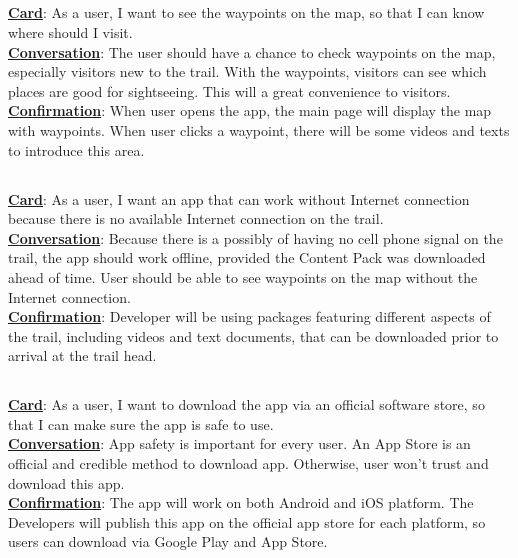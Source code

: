 \documentclass[letterpaper, 10pt,titlepage]{article}
\begin{document}
\subsection{ }
\textbf{\underline{Card}}: As a user, I want to see the waypoints on the map, so that I can know where should I visit.\\ 
\textbf{\underline{Conversation}}: The user should have a chance to check waypoints on the map, especially visitors new to the trail. With the waypoints, visitors can see which places are good for sightseeing. This will a great convenience to visitors.\\
\textbf{\underline{Confirmation}}: When user opens the app, the main page will display the map with waypoints. When user clicks a waypoint, there will be some videos and texts to introduce this area.

\subsection{ }
\textbf{\underline{Card}}: As a user, I want an app that can work without Internet connection because there is no available Internet connection on the trail.\\
\textbf{\underline{Conversation}}: Because there is a possibly of having no cell phone signal on the trail, the app should work offline, provided the Content Pack was downloaded ahead of time. User should be able to see waypoints on the map without the Internet connection.\\
\textbf{\underline{Confirmation}}: Developer will be using packages featuring different aspects of the trail, including videos and text documents, that can be downloaded prior to arrival at the trail head.
\subsection{ }
\textbf{\underline{Card}}: As a user, I want to download the app via an official software store, so that I can make sure the app is safe to use.\\
\textbf{\underline{Conversation}}: App safety is important for every user. An App Store is an official and credible method to download app. Otherwise, user won’t trust and download this app.\\
\textbf{\underline{Confirmation}}: The app will work on both Android and iOS platform. The Developers will publish this app on the official app store for each platform, so users can download via Google Play and App Store.
\end{document}
